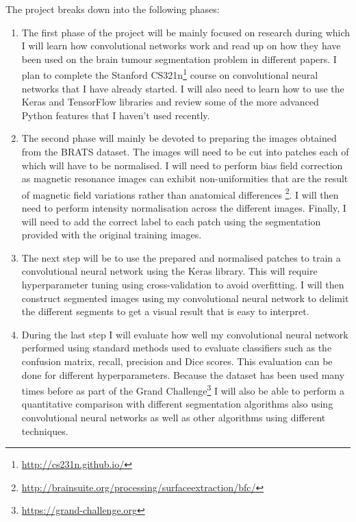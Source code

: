 \documentclass[12pt,a4paper,twoside]{article}
\begin{document}
The project breaks down into the following phases:

\begin{enumerate}

\item The first phase of the project will be mainly focused on research during which I will learn how convolutional networks  work and read up on how they have been used on the brain tumour segmentation problem in different papers. I plan to complete the Stanford CS321n\footnote{\url{http://cs231n.github.io/}} course on convolutional neural networks that I have already started. I will also need to learn how to use the Keras and TensorFlow libraries and review some of the more advanced Python features that I haven't used recently.

\item The second phase will mainly be devoted to preparing the images obtained from the BRATS dataset. The images will need to be cut into patches each of which will have to be normalised. I will need to perform bias field correction as magnetic resonance images can exhibit non-uniformities that are the result of magnetic field variations rather than anatomical differences \footnote{\url{http://brainsuite.org/processing/surfaceextraction/bfc/}}. I will then need to perform intensity normalisation across the different images. Finally, I will need to add the correct label to each patch using the segmentation provided with the original training images.

\item The next step will be to use the prepared and normalised patches to train a convolutional neural network using the Keras library. This will require hyperparameter tuning using cross-validation to avoid overfitting. I will then construct segmented images using my convolutional neural network to delimit the different segments to get a visual result that is easy to interpret.

\item During the last step I will evaluate how well my convolutional neural network performed using standard methods used to evaluate classifiers such as the confusion matrix, recall, precision and Dice scores. This evaluation can be done for different hyperparameters. Because the dataset has been used many times before as part of the Grand Challenge\footnote{\url{https://grand-challenge.org}} I will also be able to perform a quantitative comparison with different segmentation algorithms also using convolutional neural networks as well as other algorithms using different techniques.

\end{enumerate}
\end{document}
